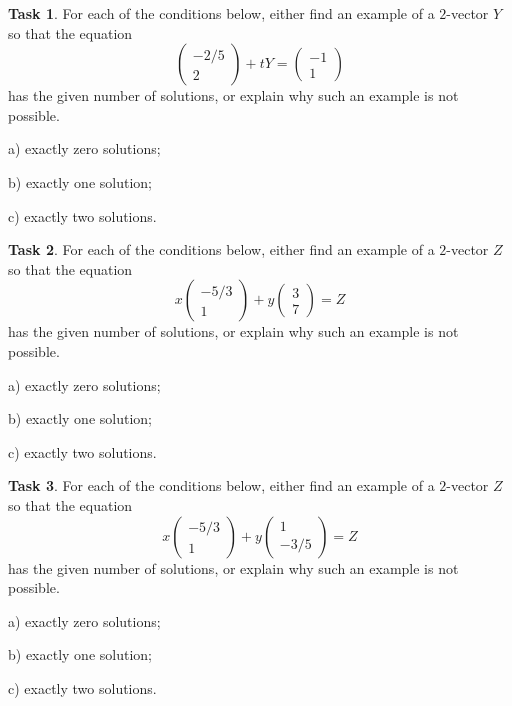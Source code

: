 \documentclass{tufte-book}
\theoremstyle{definition}
\newtheorem{task}{Task}
\begin{document}
\begin{task}
For each of the conditions below, either find an example of a $2$-vector $Y$ so that the equation
\[
\begin{pmatrix}-2/5\\2\end{pmatrix} + tY = \begin{pmatrix}-1\\1 \end{pmatrix} 
\]
has the given number of solutions, or explain why such an example is not possible.
\begin{compactitem}
\item[a)] exactly zero solutions;
\item[b)] exactly one solution; 
\item[c)] exactly two solutions.
\end{compactitem}
\end{task}

\begin{task}
For each of the conditions below, either find an example of a $2$-vector $Z$ so that the equation
\[
x\begin{pmatrix}-5/3\\1\end{pmatrix} + y\begin{pmatrix}3\\7 \end{pmatrix} = Z
\]
has the given number of solutions, or explain why such an example is not possible.
\begin{compactitem}
\item[a)] exactly zero solutions;
\item[b)] exactly one solution; 
\item[c)] exactly two solutions.
\end{compactitem}
\end{task}

\begin{task}
For each of the conditions below, either find an example of a $2$-vector $Z$ so that the equation
\[
x\begin{pmatrix}-5/3\\1\end{pmatrix} + y\begin{pmatrix}1\\-3/5 \end{pmatrix} = Z
\]
has the given number of solutions, or explain why such an example is not possible.
\begin{compactitem}
\item[a)] exactly zero solutions;
\item[b)] exactly one solution; 
\item[c)] exactly two solutions.
\end{compactitem}
\end{task}
\end{document}
